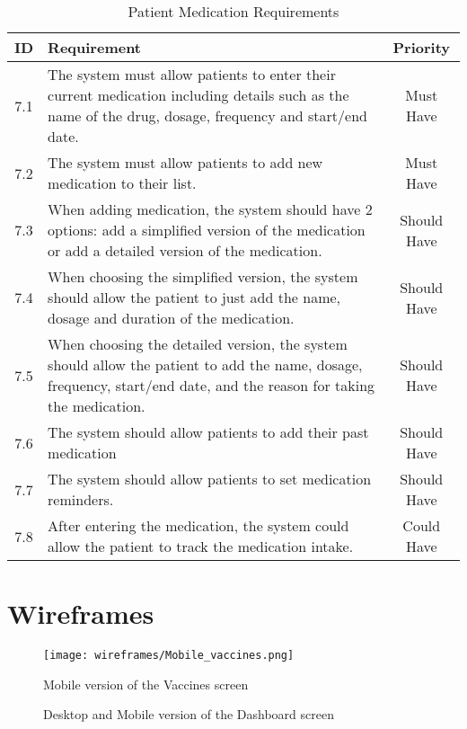 \begin{table}[h!]
    \centering
    \begin{tabular}{|c|p{10cm}|c|}
    \hline
    \textbf{ID}  & \textbf{Requirement}  & \textbf{Priority} \\ \hline
    7.1  & The system must allow patients to enter their current medication including details such as the name of the drug, dosage, frequency and start/end date. & Must Have \\ \hline
    7.2 & The system must allow patients to add new medication to their list. & Must Have \\ \hline
    7.3 & When adding medication, the system should have 2 options: add a simplified version of the medication or add a detailed version of the medication. & Should Have \\ \hline
    7.4 & When choosing the simplified version, the system should allow the patient to just add the name, dosage and duration of the medication. & Should Have \\ \hline
    7.5 & When choosing the detailed version, the system should allow the patient to add the name, dosage, frequency, start/end date, and the reason for taking the medication. & Should Have \\ \hline
    7.6  & The system should allow patients to add their past medication & Should Have \\ \hline
    7.7  & The system should allow patients to set medication reminders. & Should Have \\ \hline
    7.8 & After entering the medication, the system could allow the patient to track the medication intake. & Could Have \\ \hline

    \end{tabular}
    \caption{Patient Medication Requirements}
\end{table}

\chapter{Wireframes}\label{sec:wireframes}

\begin{figure}[ht]
    \centering
    \texttt{[image: wireframes/Mobile\_vaccines.png]}
    \caption{Mobile version of the Vaccines screen}
\end{figure}

\begin{figure}[ht]
    \centering
    \hspace{0.05\textwidth}
    \caption{Desktop and Mobile version of the Dashboard screen}
\end{figure}

